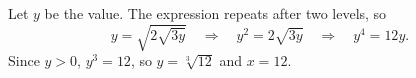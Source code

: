 Let $y$ be the value. The expression repeats after two levels, so
\[y=\sqrt{2\sqrt{3y}}\quad\Longrightarrow\quad y^2=2\sqrt{3y}\quad\Longrightarrow\quad y^4=12y.\]
Since $y>0$, $y^3=12$, so $y=\sqrt[3]{12}$ and $x=\boxed{12}$.

